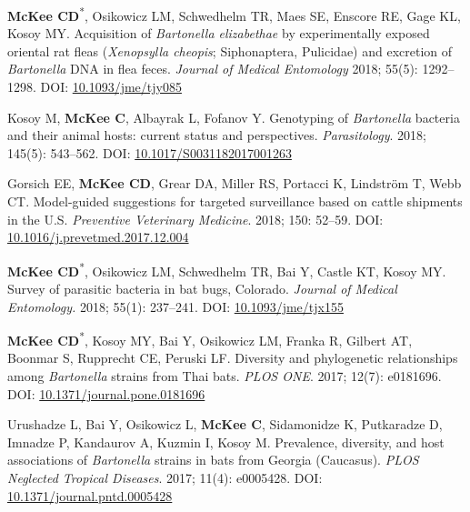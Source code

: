 \documentclass{cv}
\begin{document}
\begin{pubenum}
\item \textbf{McKee CD}\textsuperscript{*}, Osikowicz LM, Schwedhelm TR, Maes SE, Enscore RE, Gage KL, Kosoy MY. Acquisition of \textit{Bartonella elizabethae} by experimentally exposed oriental rat fleas (\textit{Xenopsylla cheopis}; Siphonaptera, Pulicidae) and excretion of \textit{Bartonella} DNA in flea feces. \textit{Journal of Medical Entomology} 2018; 55(5): 1292--1298. DOI: \href{https://doi.org/10.1093/jme/tjy085}{10.1093/jme/tjy085}

\item Kosoy M\textsuperscript{\dag}, \textbf{McKee C}\textsuperscript{\dag}, Albayrak L, Fofanov Y. Genotyping of \textit{Bartonella} bacteria and their animal hosts: current status and perspectives. \textit{Parasitology}. 2018; 145(5): 543--562. DOI: \href{https://doi.org/10.1017/S0031182017001263}{10.1017/S0031182017001263}

\item Gorsich EE, \textbf{McKee CD}, Grear DA, Miller RS, Portacci K, Lindström T, Webb CT. Model-guided suggestions for targeted surveillance based on cattle shipments in the U.S. \textit{Preventive Veterinary Medicine}. 2018; 150: 52--59. DOI: \href{https://doi.org/10.1016/j.prevetmed.2017.12.004}{10.1016/j.prevetmed.2017.12.004}

\item \textbf{McKee CD}\textsuperscript{*}, Osikowicz LM, Schwedhelm TR, Bai Y, Castle KT, Kosoy MY. Survey of parasitic bacteria in bat bugs, Colorado. \textit{Journal of Medical Entomology.} 2018; 55(1): 237--241. DOI: \href{https://doi.org/10.1093/jme/tjx155}{10.1093/jme/tjx155}

\item \textbf{McKee CD}\textsuperscript{*}, Kosoy MY, Bai Y, Osikowicz LM, Franka R, Gilbert AT, Boonmar S, Rupprecht CE, Peruski LF. Diversity and phylogenetic relationships among \textit{Bartonella} strains from Thai bats. \textit{PLOS ONE}. 2017; 12(7): e0181696. DOI: \href{https://doi.org/10.1371/journal.pone.0181696}{10.1371/journal.pone.0181696}

\item Urushadze L, Bai Y, Osikowicz L, \textbf{McKee C}, Sidamonidze K, Putkaradze D, Imnadze P, Kandaurov A, Kuzmin I, Kosoy M. Prevalence, diversity, and host associations of \textit{Bartonella} strains in bats from Georgia (Caucasus). \textit{PLOS Neglected Tropical Diseases}. 2017; 11(4): e0005428. DOI: \href{https://doi.org/10.1371/journal.pntd.0005428}{10.1371/journal.pntd.0005428}


\end{pubenum}
\end{document}
